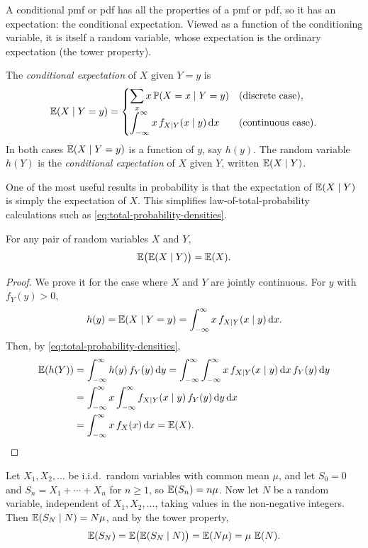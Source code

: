 A conditional pmf or pdf has all the properties of a pmf or pdf, so it has an expectation: the conditional expectation. Viewed as a function of the conditioning variable, it is itself a random variable, whose expectation is the ordinary expectation (the tower property).

\begin{definition}\label{def:conditional-expectation}
The \emph{conditional expectation} of $X$ given $Y = y$ is
\[
  \operatorname{\mathbb{E}}(X \mid Y = y) = \begin{cases}
    \displaystyle\sum_x x\, \mathbb{P}(X = x \mid Y = y) & \text{(discrete case)}, \\[2ex]
    \displaystyle\int_{-\infty}^\infty x\, f_{X \mid Y}(x \mid y) \mathop{}\!\mathrm{d} x & \text{(continuous case)}.
  \end{cases}
\]
In both cases $\operatorname{\mathbb{E}}(X \mid Y = y)$ is a function of $y$, say $h(y)$. The random variable $h(Y)$ is the \emph{conditional expectation} of $X$ given $Y$, written $\operatorname{\mathbb{E}}(X \mid Y)$.
\end{definition}

One of the most useful results in probability is that the expectation of $\operatorname{\mathbb{E}}(X \mid Y)$ is simply the expectation of $X$. This simplifies law-of-total-probability calculations such as \eqref{eq:total-probability-densities}.

\begin{theorem}\label{thm:tower-property}
For any pair of random variables $X$ and $Y$,
\[
  \operatorname{\mathbb{E}}\bigl(\operatorname{\mathbb{E}}(X \mid Y)\bigr) = \operatorname{\mathbb{E}}(X).
\]
\end{theorem}

\begin{proof}
We prove it for the case where $X$ and $Y$ are jointly continuous. For $y$ with $f_Y(y) > 0$,
\[
  h(y) = \operatorname{\mathbb{E}}(X \mid Y = y) = \int_{-\infty}^\infty x\, f_{X \mid Y}(x \mid y) \mathop{}\!\mathrm{d} x.
\]
Then, by \eqref{eq:total-probability-densities},
\begin{align*}
  \operatorname{\mathbb{E}}(h(Y)) &= \int_{-\infty}^\infty h(y)\, f_Y(y) \mathop{}\!\mathrm{d} y = \int_{-\infty}^\infty \int_{-\infty}^\infty x\, f_{X \mid Y}(x \mid y) \mathop{}\!\mathrm{d} x\, f_Y(y) \mathop{}\!\mathrm{d} y \\
  &= \int_{-\infty}^\infty x \int_{-\infty}^\infty f_{X \mid Y}(x \mid y)\, f_Y(y) \mathop{}\!\mathrm{d} y \mathop{}\!\mathrm{d} x \\
  &= \int_{-\infty}^\infty x\, f_X(x) \mathop{}\!\mathrm{d} x = \operatorname{\mathbb{E}}(X). \qedhere
\end{align*}
\end{proof}

\begin{example}\label{ex:random-sums}
Let $X_1, X_2, \ldots$ be i.i.d.\ random variables with common mean $\mu$, and let $S_0 = 0$ and $S_n = X_1 + \cdots + X_n$ for $n \ge 1$, so $\operatorname{\mathbb{E}}(S_n) = n\mu$. Now let $N$ be a random variable, independent of $X_1, X_2, \ldots$, taking values in the non-negative integers. Then $\operatorname{\mathbb{E}}(S_N \mid N) = N\mu$, and by the tower property,
\[
  \operatorname{\mathbb{E}}(S_N) = \operatorname{\mathbb{E}}\bigl(\operatorname{\mathbb{E}}(S_N \mid N)\bigr) = \operatorname{\mathbb{E}}(N\mu) = \mu\, \operatorname{\mathbb{E}}(N).
\]
\end{example}
